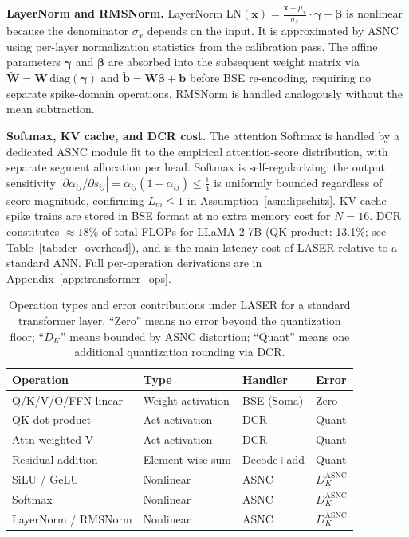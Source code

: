 \documentclass{article}
\theoremstyle{plain}
\theoremstyle{definition}
\theoremstyle{remark}
\begin{document}
\noindent\textbf{LayerNorm and RMSNorm.}
LayerNorm $\mathrm{LN}(\mathbf{x}) = \tfrac{\mathbf{x}-\mu_x}{\sigma_x}\cdot\boldsymbol{\gamma}+\boldsymbol{\beta}$ is nonlinear because the denominator $\sigma_x$ depends on the input. It is approximated by ASNC using per-layer normalization statistics from the calibration pass. The affine parameters $\boldsymbol{\gamma}$ and $\boldsymbol{\beta}$ are absorbed into the subsequent weight matrix via $\tilde{\mathbf{W}} = \mathbf{W}\,\mathrm{diag}(\boldsymbol{\gamma})$ and $\tilde{\mathbf{b}} = \mathbf{W}\boldsymbol{\beta}+\mathbf{b}$ before BSE re-encoding, requiring no separate spike-domain operations. RMSNorm is handled analogously without the mean subtraction.

\noindent\textbf{Softmax, KV cache, and DCR cost.}
The attention Softmax is handled by a dedicated ASNC module fit to the empirical attention-score distribution, with separate segment allocation per head. Softmax is self-regularizing: the output sensitivity $|\partial\alpha_{ij}/\partial s_{ij}| = \alpha_{ij}(1-\alpha_{ij}) \le \tfrac{1}{4}$ is uniformly bounded regardless of score magnitude, confirming $L_m \le 1$ in Assumption~\ref{asm:lipschitz}. KV-cache spike trains are stored in BSE format at no extra memory cost for $N=16$. DCR constitutes $\approx\!18\%$ of total FLOPs for LLaMA-2 7B (QK product: 13.1\%; see Table~\ref{tab:dcr_overhead}), and is the main latency cost of LASER relative to a standard ANN. Full per-operation derivations are in Appendix~\ref{app:transformer_ops}.

\begin{table}[h!]
\centering
\caption{Operation types and error contributions under LASER for a standard transformer
layer. ``Zero'' means no error beyond the quantization floor; ``$D_K$'' means bounded
by ASNC distortion; ``Quant'' means one additional quantization rounding via DCR.}
\label{tab:transformer_ops}
\small
\begin{tabular}{llll}
\toprule
\textbf{Operation} & \textbf{Type} & \textbf{Handler} & \textbf{Error} \\
\midrule
Q/K/V/O/FFN linear  & Weight-activation  & BSE (Soma)  & Zero \\
QK dot product       & Act-activation     & DCR         & Quant \\
Attn-weighted V      & Act-activation     & DCR         & Quant \\
Residual addition    & Element-wise sum   & Decode+add  & Quant \\
SiLU / GeLU         & Nonlinear          & ASNC        & $D_K^{\mathrm{ASNC}}$ \\
Softmax              & Nonlinear          & ASNC        & $D_K^{\mathrm{ASNC}}$ \\
LayerNorm / RMSNorm & Nonlinear          & ASNC        & $D_K^{\mathrm{ASNC}}$ \\
\bottomrule
\end{tabular}
\end{table}
\end{document}
